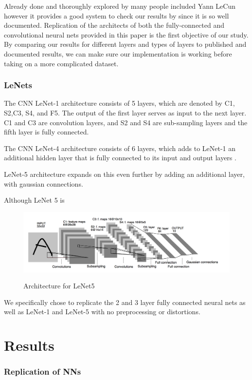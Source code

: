 \documentclass[12pt, twocolumn]{article}
\begin{document}
Already done and thoroughly explored by many people included Yann LeCun \cite{LeCun1998} however it provides a good system to check our results by since it is so well documented.  Replication of the architects of both the fully-connected and convolutional neural nets provided in this paper is the first objective of our study. By comparing our results  for different layers and types of layers to published and documented results, we can make sure our implementation is working before taking on a more complicated dataset. 

\subsubsection{LeNets}
The CNN LeNet-1 architecture consists of 5 layers, which are denoted by C1, S2,C3, S4, and F5.  The output of the first layer serves as
input to the next layer. C1 and C3 are convolution layers, and S2 and S4 are sub-sampling layers and the fifth layer is fully connected. \cite{LeCun89}

The CNN LeNet-4 architecture consists of 6 layers, which adds to LeNet-1 an additional hidden layer that is fully connected to its  input and output layers . \cite{LeCun95}

LeNet-5 architecture expands on this even further by adding an additional layer, with gaussian connections. 

 Although LeNet 5 is 

 \begin{figure}
\includegraphics[scale=.6]{LeNet5.png}
\label{fig:LeNet5}
\caption{Architecture for LeNet5 \cite{LeCun1998}}
\end{figure}



 We specifically chose to replicate the 2 and 3 layer fully connected neural nets as well as LeNet-1 and LeNet-5 with no preprocessing or distortions. 


\section{Results}
\subsubsection{Replication of NNs}
\end{document}

